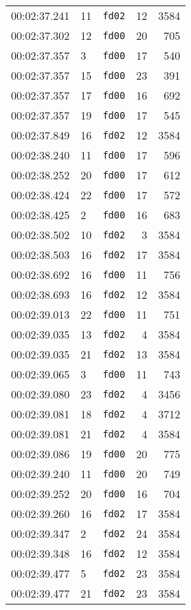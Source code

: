 \documentclass{article}
\begin{document}
\begin{longtable}{lllrr}
00:02:37.241 & 11 & \texttt{fd02} & 12 & 3584 \\
00:02:37.302 & 12 & \texttt{fd00} & 20 & 705 \\
00:02:37.357 & 3 & \texttt{fd00} & 17 & 540 \\
00:02:37.357 & 15 & \texttt{fd00} & 23 & 391 \\
00:02:37.357 & 17 & \texttt{fd00} & 16 & 692 \\
00:02:37.357 & 19 & \texttt{fd00} & 17 & 545 \\
00:02:37.849 & 16 & \texttt{fd02} & 12 & 3584 \\
00:02:38.240 & 11 & \texttt{fd00} & 17 & 596 \\
00:02:38.252 & 20 & \texttt{fd00} & 17 & 612 \\
00:02:38.424 & 22 & \texttt{fd00} & 17 & 572 \\
00:02:38.425 & 2 & \texttt{fd00} & 16 & 683 \\
00:02:38.502 & 10 & \texttt{fd02} & 3 & 3584 \\
00:02:38.503 & 16 & \texttt{fd02} & 17 & 3584 \\
00:02:38.692 & 16 & \texttt{fd00} & 11 & 756 \\
00:02:38.693 & 16 & \texttt{fd02} & 12 & 3584 \\
00:02:39.013 & 22 & \texttt{fd00} & 11 & 751 \\
00:02:39.035 & 13 & \texttt{fd02} & 4 & 3584 \\
00:02:39.035 & 21 & \texttt{fd02} & 13 & 3584 \\
00:02:39.065 & 3 & \texttt{fd00} & 11 & 743 \\
00:02:39.080 & 23 & \texttt{fd02} & 4 & 3456 \\
00:02:39.081 & 18 & \texttt{fd02} & 4 & 3712 \\
00:02:39.081 & 21 & \texttt{fd02} & 4 & 3584 \\
00:02:39.086 & 19 & \texttt{fd00} & 20 & 775 \\
00:02:39.240 & 11 & \texttt{fd00} & 20 & 749 \\
00:02:39.252 & 20 & \texttt{fd00} & 16 & 704 \\
00:02:39.260 & 16 & \texttt{fd02} & 17 & 3584 \\
00:02:39.347 & 2 & \texttt{fd02} & 24 & 3584 \\
00:02:39.348 & 16 & \texttt{fd02} & 12 & 3584 \\
00:02:39.477 & 5 & \texttt{fd02} & 23 & 3584 \\
00:02:39.477 & 21 & \texttt{fd02} & 23 & 3584 \\

\end{longtable}
\end{document}

